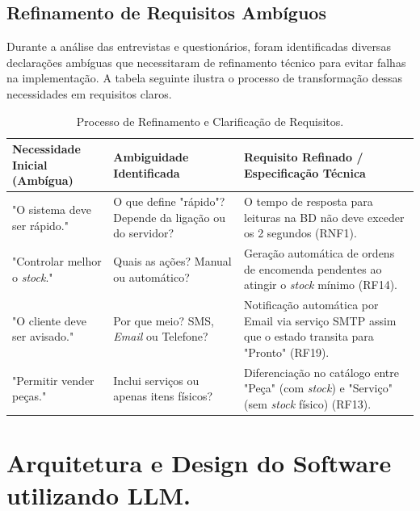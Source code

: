 \documentclass[a4paper,12pt]{scrreprt}
\begin{document}
\section{Refinamento de Requisitos Ambíguos}
Durante a análise das entrevistas e questionários, foram identificadas diversas declarações ambíguas que necessitaram de refinamento técnico para evitar falhas na implementação. A tabela seguinte ilustra o processo de transformação dessas necessidades em requisitos claros. 
\begin{table}[H]
    \centering
    \renewcommand{\arraystretch}{1.5}
    \begin{tabularx}{\textwidth}{|>{\RaggedRight\arraybackslash}p{3.5cm}|>{\RaggedRight\arraybackslash}X|>{\RaggedRight\arraybackslash}X|}
        \hline
        \rowcolor{gray!15} \textbf{Necessidade Inicial (Ambígua)} & \textbf{Ambiguidade Identificada} & \textbf{Requisito Refinado / Especificação Técnica} \\ \hline
        
        "O sistema deve ser rápido."
& O que define "rápido"? Depende da ligação ou do servidor?
& O tempo de resposta para leituras na BD não deve exceder os 2 segundos (RNF1).
\\ \hline
        
        "Controlar melhor o \textit{stock}."
& Quais as ações? Manual ou automático? & Geração automática de ordens de encomenda pendentes ao atingir o \textit{stock} mínimo (RF14).
\\ \hline
        
        "O cliente deve ser avisado."
& Por que meio? SMS, \textit{Email} ou Telefone? & Notificação automática por Email via serviço SMTP assim que o estado transita para "Pronto" (RF19).
\\ \hline
        
        "Permitir vender peças."
& Inclui serviços ou apenas itens físicos? & Diferenciação no catálogo entre "Peça" (com \textit{stock}) e "Serviço" (sem \textit{stock} físico) (RF13).
\\ \hline
    \end{tabularx}
    \caption{Processo de Refinamento e Clarificação de Requisitos.}
    \label{tab:refinamento}
\end{table}

\chapter{Arquitetura e Design do Software utilizando LLM. }
\end{document}
